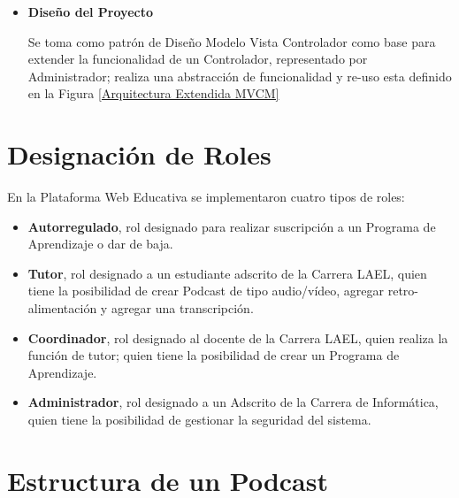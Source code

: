 \begin{itemize}

\item \textbf{Diseño del Proyecto}

Se toma como patrón de Diseño Modelo Vista Controlador como base para  extender
la funcionalidad de un Controlador, representado por Administrador; realiza una
abstracción de funcionalidad y re-uso esta definido en la Figura 
\ref{Arquitectura Extendida MVCM}

\begin{minipage}{1.0\textwidth}
	\centering
	\label{Arquitectura Extendida MVCM}
\end{minipage}

\end{itemize}

\section{Designación de Roles}

En la Plataforma Web Educativa se implementaron cuatro tipos de roles:

\begin{itemize}

\item \textbf{Autorregulado}, rol designado para
realizar suscripción a un Programa de Aprendizaje o dar de baja.

\item \textbf{Tutor}, rol designado a un estudiante adscrito de la Carrera
LAEL, quien tiene la posibilidad de crear Podcast de tipo audio/vídeo, agregar
retro-alimentación y agregar una transcripción. 

\item \textbf{Coordinador}, rol designado al docente de la Carrera LAEL, quien
realiza la función de tutor; quien tiene la posibilidad de crear un Programa
de Aprendizaje.

\item \textbf{Administrador}, rol designado a un Adscrito de la Carrera de
Informática, quien tiene la posibilidad de gestionar la seguridad del sistema.

\end{itemize}

\section{Estructura de un Podcast} \label{structPodcast}


